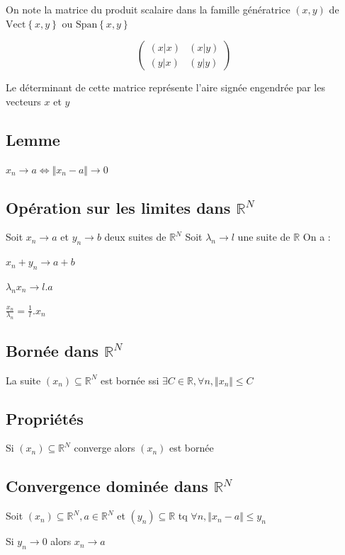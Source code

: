 \documentclass[a4paper,10pt]{article}
\newcommand{\ap}{\rightarrow}
\newcommand{\R}{\mathbb{R}}
\newcommand{\ioi}{\Leftrightarrow}
\newcommand{\tset}[1]{\left\lbrace #1 \right\rbrace}
\begin{document}
On note la matrice du produit scalaire dans la famille génératrice $(x,y)$ de $\mbox{Vect} \tset{x,y}$ ou $\mbox{Span} \tset{x,y}$

$$
\begin{pmatrix}
(x \vert x) & (x \vert y) \\
(y \vert x) & (y \vert y)
\end{pmatrix}
$$

Le déterminant de cette matrice représente l'aire signée engendrée par les vecteurs $x$ et $y$

\subsection{Lemme}

$x_n \ap a \ioi \Vert x_n - a \Vert \ap 0$

\subsection{Opération sur les limites dans $\R^N$}

Soit $x_n \ap a$ et $y_n \ap b$ deux suites de $\R^N$
Soit $\lambda_n \ap l$ une suite de $\R$
On a :

$x_n + y_n \ap a + b$

$\lambda_n x_n \ap l.a$

$\frac{x_n}{\lambda_n} = \frac{1}{l} . x_n$
\subsection{Bornée dans $\R^N$}

La suite $(x_n) \subseteq \R^N$ est bornée ssi $\exists C \in \R, \forall n, \Vert x_n \Vert \leq C$

\subsection{Propriétés}

Si $(x_n) \subseteq \R^N$ converge alors $(x_n)$ est bornée

\subsection{Convergence dominée dans $\R^N$}

Soit $(x_n) \subseteq \R^N, a \in \R^N$ et $(y_n) \subseteq \R$ tq $\forall n, \Vert x_n - a \Vert \leq y_n$

Si $y_n \ap 0$ alors $x_n \ap a$
\end{document}
